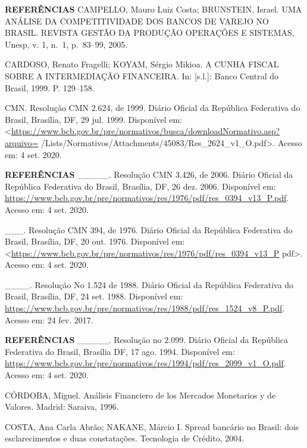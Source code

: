 \documentclass[
  ignorenonframetext,
  aspectratio=169,
  ignorenonframetext]{beamer}
\begin{document}
\begin{frame}{\textbf{REFERÊNCIAS}}
\protect\hypertarget{referuxeancias-8}{}
CAMPELLO, Mauro Luiz Costa; BRUNSTEIN, Israel. UMA ANÁLISE DA
COMPETITIVIDADE DOS BANCOS DE VAREJO NO BRASIL. REVISTA GESTÃO DA
PRODUÇÃO OPERAÇÕES E SISTEMAS, Unesp, v. 1, n.~1, p.~83--99, 2005.

CARDOSO, Renato Fragelli; KOYAM, Sérgio Mikioa. A CUNHA FISCAL SOBRE A
INTERMEDIAÇÃO FINANCEIRA. In: {[}s.l.{]}: Banco Central do Brasil, 1999.
P. 129--158.

CMN. Resolução CMN 2.624, de 1999. Diário Oficial da República
Federativa do Brasil, Brasília, DF, 29 jul. 1999. Disponível em:
\textless{}\url{https://www.bcb.gov.br/pre/normativos/busca/downloadNormativo.asp?arquivo=}
/Lists/Normativos/Attachments/45083/Res\_2624\_v1\_O.pdf\textgreater.
Acesso em: 4 set. 2020.
\end{frame}

\begin{frame}{\textbf{REFERÊNCIAS}}
\protect\hypertarget{referuxeancias-9}{}
\_\_\_\_\_. Resolução CMN 3.426, de 2006. Diário Oficial da República
Federativa do Brasil, Brasília, DF, 26 dez. 2006. Disponível em:
\url{https://www.bcb.gov.br/pre/normativos/res/1976/pdf/res_0394_v13_P.pdf}.
Acesso em: 4 set. 2020.

\_\_\_. Resolução CMN 394, de 1976. Diário Oficial da República
Federativa do Brasil, Brasília, DF, 20 out. 1976. Disponível em:
\textless{}\url{https://www.bcb.gov.br/pre/normativos/res/1976/pdf/res_0394_v13_P}
pdf\textgreater. Acesso em: 4 set. 2020.

\_\_\_\_. Resolução No 1.524 de 1988. Diário Oficial da República
Federativa do Brasil, Brasília, DF, 24 set. 1988. Disponível em:
\url{https://www.bcb.gov.br/pre/normativos/res/1988/pdf/res_1524_v8_P.pdf}.
Acesso em: 24 fev. 2017.
\end{frame}

\begin{frame}{\textbf{REFERÊNCIAS}}
\protect\hypertarget{referuxeancias-10}{}
\_\_\_\_\_. Resolução no 2.099. Diário Oficial da República Federativa
do Brasil, Brasília DF, 17 ago. 1994. Disponível em:
\url{https://www.bcb.gov.br/pre/normativos/res/1994/pdf/res_2099_v1_O.pdf}.
Acesso em: 4 set. 2020.

CÓRDOBA, Miguel. Análisis Financiero de los Mercados Monetarios y de
Valores. Madrid: Saraiva, 1996.

COSTA, Ana Carla Abrão; NAKANE, Márcio I. Spread bancário no Brasil:
dois esclarecimentos e duas constatações. Tecnologia de Crédito, 2004.
\end{frame}
\end{document}
